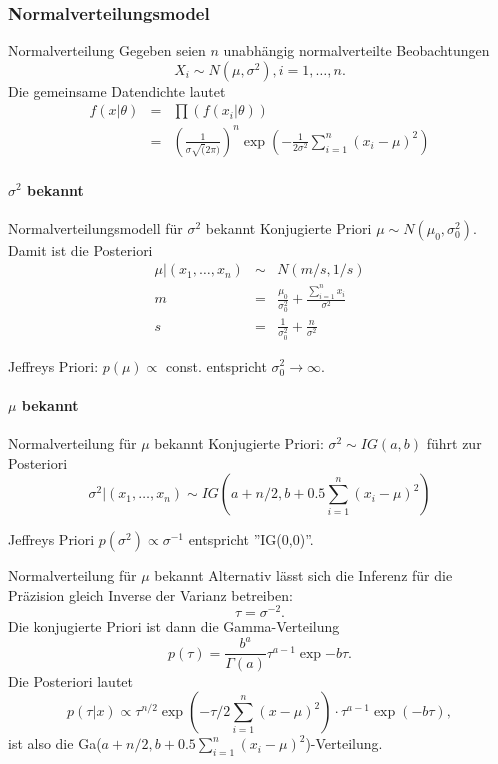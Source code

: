 \documentclass[german]{beamer}
\numberwithin{Bsp}{section}
\numberwithin{Def}{section}
\numberwithin{Stz}{section}
\begin{document}
\subsubsection{Normalverteilungsmodel}
\begin{frame}{Normalverteilung}
Gegeben seien $n$ unabhängig normalverteilte Beobachtungen
$$ 
X_i \sim  N(\mu,\sigma^2), i=1,\ldots,n.
$$ 
Die gemeinsame Datendichte lautet
\begin{eqnarray*}
f(x|\theta) &=& \prod\left(f(x_i|\theta)\right) \\
&=& \left(\frac{1}{\sigma\sqrt(2\pi)}\right)^n \exp\left(-\frac{1}{2\sigma^2}\sum_{i=1}^n (x_i-\mu)^2\right)
\end{eqnarray*}
\end{frame}

\paragraph{$\sigma^2$ bekannt}
\begin{frame}{Normalverteilungsmodell für $\sigma^2$ bekannt}
Konjugierte Priori $\mu\sim N(\mu_0,\sigma_0^2)$. Damit ist die Posteriori
\begin{eqnarray*}
\mu|(x_1,\ldots,x_n) &\sim &N(m/s,1/s)\\
m&=&\frac{\mu_0}{\sigma_0^2} + \frac{\sum_{i=1}^n x_i}{\sigma^2}\\
s &=& \frac{1}{\sigma_0^2} + \frac{n}{\sigma^2}
\end{eqnarray*}

Jeffreys Priori: $p(\mu)\propto$ const. entspricht $\sigma^2_0\to\infty$.
\end{frame}

\paragraph{$\mu$ bekannt}
\begin{frame}{Normalverteilung für $\mu$ bekannt}
Konjugierte Priori: $\sigma^2\sim IG(a,b)$ führt zur Posteriori
\[
\sigma^2|(x_1,\ldots,x_n) \sim IG\left(a+n/2, b+0.5\sum_{i=1}^n{(x_i-\mu)^2}\right)
\]

Jeffreys Priori $p(\sigma^2)\propto\sigma^{-1}$ entspricht ''IG(0,0)''.
\end{frame}

\begin{frame}{Normalverteilung für $\mu$ bekannt}
Alternativ lässt sich die Inferenz für die Präzision gleich Inverse der Varianz betreiben:
$$ \tau=\sigma^{-2}. $$
Die konjugierte Priori ist dann die Gamma-Verteilung
\[
p(\tau) = \frac{b^a}{\Gamma(a)}\tau^{a-1}\exp{-b\tau}.
\]
Die Posteriori lautet
$$
p(\tau|x)\propto \tau^{n/2}\exp\left(-\tau/2\sum_{i=1}^n(x-\mu)^2\right)\cdot\tau^{a-1}\exp(-b\tau),
$$
ist also die Ga($a+n/2, b+0.5\sum_{i=1}^n{(x_i-\mu)^2}$)-Verteilung.
\end{frame}
\end{document}
